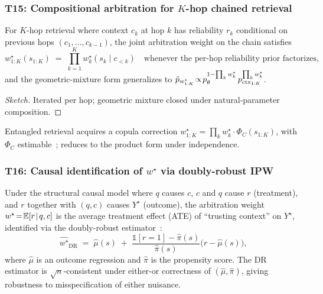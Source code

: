 \subsubsection{T15: Compositional arbitration for $K$-hop chained retrieval}
\label{app:t15-compositional}

\begin{theorem}
\label{thm:t15-compositional}
For $K$-hop retrieval where context $c_k$ at hop $k$ has reliability
$r_k$ conditional on previous hops $(c_1,\ldots,c_{k-1})$, the joint
arbitration weight on the chain satisfies
\[
w^\star_{1:K}(s_{1:K})
\;=\;
\prod_{k=1}^{K}
w^\star_k(s_k\mid c_{<k})
\quad\text{whenever the per-hop reliability prior factorizes,}
\]
and the geometric-mixture form generalizes to
$\hat p_{w^\star_{1:K}}\!\propto\!p_\theta^{1-\prod_k w^\star_k}\,p_{\mathrm{ctx}_{1:K}}^{\prod_k w^\star_k}$.
\end{theorem}

\begin{proof}[Sketch]
Iterated  per hop; geometric mixture
closed under natural-parameter composition.
\end{proof}

\begin{remark}
Entangled retrieval acquires a copula correction
$w^\star_{1:K}\!=\!\prod_k w^\star_k\cdot\Phi_C(s_{1:K})$, with
$\Phi_C$ estimable~\citep{nelsen2006introduction}; reduces to the
product form under independence.
\end{remark}

\subsubsection{T16: Causal identification of $w^\star$ via doubly-robust IPW}
\label{app:t16-causal}

\begin{theorem}
\label{thm:t16-causal}
Under the structural causal model where $q$ causes $c$, $c$ and
$q$ cause $r$ (treatment), and $r$ together with $(q,c)$ causes
$Y^\star$ (outcome), the arbitration weight $w^\star\!=\!\mathbb{E}[r\!\mid\!q,c]$
is the average treatment effect (ATE) of ``trusting context'' on
$Y^\star$, identified via the doubly-robust
estimator~\citep{robins1994estimation,chernozhukov2018doubleml}:
\[
\widehat{w^\star}_{\mathrm{DR}}
\;=\;
\widehat\mu(s)
\;+\;
\frac{\mathbb{1}[r\!=\!1]\!-\!\widehat\pi(s)}{\widehat\pi(s)}\bigl(r\!-\!\widehat\mu(s)\bigr),
\]
where $\widehat\mu$ is an outcome regression and $\widehat\pi$
is the propensity score.  The DR estimator is $\sqrt n$-consistent
under either-or correctness of $(\widehat\mu,\widehat\pi)$, giving
robustness to misspecification of either nuisance.
\end{theorem}

